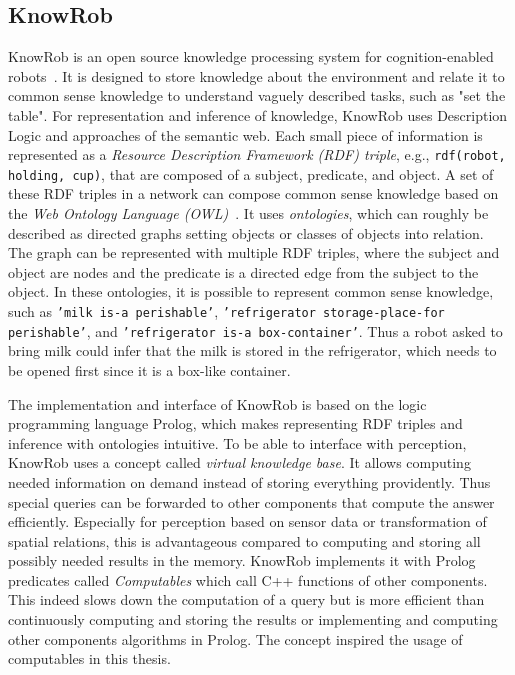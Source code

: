\subsection{KnowRob}
\label{sec:knowrob}
KnowRob is an open source knowledge processing system for
cognition-enabled robots~\cite{KnowRob,KnowRob-Representation}. It is
designed to store knowledge about the environment and 
relate it to common sense knowledge to understand vaguely described
tasks, such as "set the table". For representation and inference of
knowledge, KnowRob uses Description Logic and approaches of the
semantic web.  Each small piece of information is represented as a
\emph{Resource Description Framework (RDF) triple}, e.g., \texttt{rdf(robot,
holding, cup)}, that are composed of a subject, predicate, and
object. A set of these RDF triples in a network can compose
common sense knowledge based on the \emph{Web Ontology Language
  (OWL)}~\cite{owl}. It uses \emph{ontologies}, which can roughly be described as
directed graphs setting objects or classes of objects into
relation. The graph can be represented with multiple RDF triples,
where the subject and object are nodes and the predicate is a directed
edge from the subject to the object. In these ontologies, it is
possible to represent common sense knowledge, such as \texttt{'milk is-a
perishable'}, \texttt{'refrigerator storage-place-for perishable'}, and
\texttt{'refrigerator is-a box-container'}. Thus a robot asked to bring milk
could infer that the milk is stored in the refrigerator, which needs
to be opened first since it is a box-like container.

The implementation and interface of KnowRob is based on the logic
programming language Prolog, which makes representing RDF triples and
inference with ontologies intuitive.  To be able to interface with
perception, KnowRob uses a concept called \emph{virtual knowledge
  base}. It allows computing needed information on demand instead of
storing everything providently. Thus special queries can be forwarded
to other components that compute the answer efficiently.  Especially
for perception based on sensor data or transformation of spatial
relations, this is advantageous compared to computing and storing all
possibly needed results in the memory.  KnowRob implements it with
Prolog predicates called \emph{Computables} which call C++ functions
of other components. This indeed slows down the computation of a query
but is more efficient than continuously computing and storing the
results or implementing and computing other components algorithms in
Prolog.  The concept inspired the usage of computables in this thesis.

